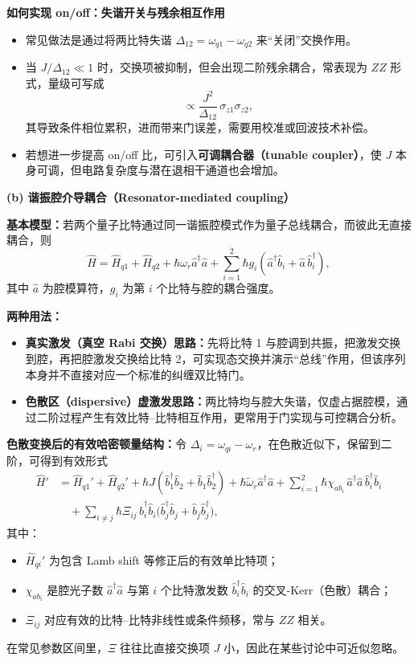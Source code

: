 \documentclass[12pt,a4paper,oneside]{ctexbook}
\begin{document}
\noindent\textbf{如何实现 on/off：失谐开关与残余相互作用}

\begin{itemize}
  \item 常见做法是通过将两比特失谐 $\Delta_{12}=\omega_{q1}-\omega_{q2}$ 来“关闭”交换作用。
  \item 当 $J/\Delta_{12}\ll 1$ 时，交换项被抑制，但会出现二阶残余耦合，常表现为 \textbf{$ZZ$} 形式，量级可写成
  \[
    \propto \frac{J^2}{\Delta_{12}}\,\sigma_{z1}\sigma_{z2},
  \]
  其导致条件相位累积，进而带来门误差，需要用校准或回波技术补偿。
  \item 若想进一步提高 on/off 比，可引入\textbf{可调耦合器（tunable coupler）}，使 $J$ 本身可调，但电路复杂度与潜在退相干通道也会增加。
\end{itemize}

\noindent\textbf{(b) 谐振腔介导耦合（Resonator-mediated coupling）}

\noindent\textbf{基本模型：}若两个量子比特通过同一谐振腔模式作为量子总线耦合，而彼此无直接耦合，则
\begin{equation}
  \hat H=\hat H_{q1}+\hat H_{q2}+\hbar\omega_r \hat a^\dagger \hat a+\sum_{i=1}^{2}\hbar g_i(\hat a^\dagger \hat b_i+\hat a\,\hat b_i^\dagger),
  \label{eq:bus}
\end{equation}
其中 $\hat a$ 为腔模算符，$g_i$ 为第 $i$ 个比特与腔的耦合强度。

\noindent\textbf{两种用法：}
\begin{itemize}
  \item \textbf{真实激发（真空 Rabi 交换）思路：}先将比特 1 与腔调到共振，把激发交换到腔，再把腔激发交换给比特 2，可实现态交换并演示“总线”作用，但该序列本身并不直接对应一个标准的纠缠双比特门。
  \item \textbf{色散区（dispersive）虚激发思路：}两比特均与腔大失谐，仅虚占据腔模，通过二阶过程产生有效比特--比特相互作用，更常用于门实现与可控耦合分析。
\end{itemize}

\noindent\textbf{色散变换后的有效哈密顿量结构：}令 $\Delta_i=\omega_{qi}-\omega_r$，在色散近似下，保留到二阶，可得到有效形式
\begin{align}
  \hat H'&=\hat H_{q1}'+\hat H_{q2}'+\hbar J(\hat b_1^\dagger \hat b_2+\hat b_1 \hat b_2^\dagger)
  +\hbar\tilde{\omega}_r \hat a^\dagger \hat a
  +\sum_{i=1}^{2}\hbar \chi_{ab_i}\,\hat a^\dagger \hat a\, \hat b_i^\dagger \hat b_i \nonumber\\
  &\quad+\sum_{i\neq j}\hbar \Xi_{ij}\,\hat b_i^\dagger \hat b_i\big(\hat b_j^\dagger \hat b_j+\hat b_j \hat b_j^\dagger\big),
  \label{eq:Heffbus}
\end{align}
其中：
\begin{itemize}
  \item $\hat H_{qi}'$ 为包含 Lamb shift 等修正后的有效单比特项；
  \item $\chi_{ab_i}$ 是腔光子数 $\hat a^\dagger\hat a$ 与第 $i$ 个比特激发数 $\hat b_i^\dagger\hat b_i$ 的交叉-Kerr（色散）耦合；
  \item $\Xi_{ij}$ 对应有效的比特--比特非线性或条件频移，常与 $ZZ$ 相关。
\end{itemize}
在常见参数区间里，$\Xi$ 往往比直接交换项 $J$ 小，因此在某些讨论中可近似忽略。
\end{document}
